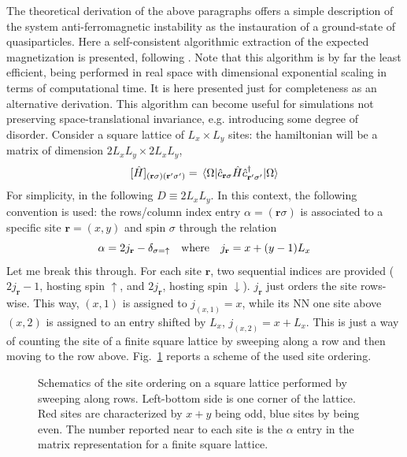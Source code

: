 The theoretical derivation of the above paragraphs offers a simple description of the system anti-ferromagnetic instability as the instauration of a ground-state of quasiparticles. Here a self-consistent algorithmic extraction of the expected magnetization is presented, following \cite{scholle2023comprehensive}. Note that this algorithm is by far the least efficient, being performed in real space with dimensional exponential scaling in terms of computational time. It is here presented just for completeness as an alternative derivation. This algorithm can become useful for simulations not preserving space-translational invariance, e.g. introducing some degree of disorder. Consider a square lattice of $L_x \times L_y$ sites: the hamiltonian will be a matrix of dimension $2L_x L_y \times 2L_x L_y$,
\[
	[ \hat H ]_{(\mathbf{r}\sigma)(\mathbf{r}'\sigma')} = \mel{\Omega}{ \hat c_{\mathbf{r}\sigma} \hat H \hat c_{\mathbf{r}'\sigma'}^\dagger}{\Omega}
\]
For simplicity, in the following $D \equiv 2L_x L_y$. In this context, the following convention is used: the rows/column index entry $\alpha=(\mathbf{r}\sigma)$ is associated to a specific site $\mathbf{r}=(x,y)$ and spin $\sigma$ through the relation
\[
	\alpha = 2j_\mathbf{r}-\delta_{\sigma=\uparrow}
	\qq{where}
	j_\mathbf{r} = x+(y-1)L_x 
\]
Let me break this through. For each site $\mathbf{r}$, two sequential indices are provided ($2j_\mathbf{r}-1$, hosting spin $\uparrow$, and $2j_\mathbf{r}$, hosting spin $\downarrow$). $j_\mathbf{r}$ just orders the site rows-wise. This way, $(x,1)$ is assigned to $j_{(x,1)}=x$, while its NN one site above $(x,2)$ is assigned to an entry shifted by $L_x$, $j_{(x,2)}=x+L_x$. This is just a way of counting the site of a finite square lattice by sweeping along a row and then moving to the row above. Fig.~\ref{appfig:square-lattice-ordering} reports a scheme of the used site ordering.

\begin{figure}
	\centering
	
	\caption{Schematics of the site ordering on a square lattice performed by sweeping along rows. Left-bottom side is one corner of the lattice. Red sites are characterized by $x+y$ being odd, blue sites by being even. The number reported near to each site is the $\alpha$ entry in the matrix representation for a finite square lattice.}
	\label{appfig:square-lattice-ordering}
\end{figure}


